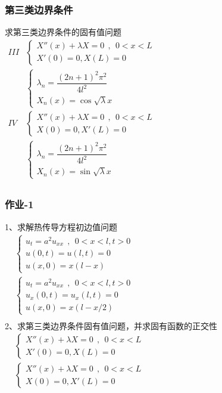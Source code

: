 \begin{frame}
	\frametitle{第三类边界条件}
	求第三类边界条件的固有值问题\\
	$\begin{array}{lllllllll}
	III & \begin{cases}
			X'' (x)  + \lambda X =0   ~~,~~ 0<x<L\\
			X' (0) =0, X (L) =0
	\end{cases}\\	
	& \begin{cases}
		\lambda_n=\dfrac{(2n+1)^2 \pi ^2}{4l^2}\\
		X_n(x) = \cos \sqrt{\lambda} x
	\end{cases}\\	
	IV&\begin{cases}
		X'' (x)  + \lambda X =0   ~~,~~ 0<x<L\\
		X (0) =0, X' (L) =0
	\end{cases} \\	
	& \begin{cases}
		\lambda_n=\dfrac{(2n+1)^2 \pi ^2}{4l^2}\\
		X_n(x) = \sin \sqrt{\lambda} x
    \end{cases}\\	
	\end{array}$ \\ 
\end{frame}	

\begin{frame}
	\frametitle{作业-1}
	1、求解热传导方程初边值问题\\
	$\begin{array}{lllllllll}
		&\begin{cases}
			u_{t} =a^2u_{xx} ~~,~~ 0<x<l, t>0\\
			u(0,t) =u(l,t)=0 \\
			u(x,0) =x (l-x)
		\end{cases}\\	
		&\begin{cases}
			u_{t} =a^2u_{xx} ~~,~~ 0<x<l, t>0\\
			u_x(0,t) =u_x(l,t)=0 \\
			u(x,0) =x(l-x/2)
		\end{cases} \\	
	\end{array}$ \\ 
	2、求第三类边界条件固有值问题，并求固有函数的正交性\\
	$\begin{array}{lllllllll}
		& \begin{cases}
			X'' (x)  + \lambda X =0   ~~,~~ 0<x<L\\
			X' (0) =0, X (L) =0
		\end{cases}\\	
		&\begin{cases}
			X'' (x)  + \lambda X =0   ~~,~~ 0<x<L\\
			X (0) =0, X' (L) =0
		\end{cases} \\	
	\end{array}$ \\ 	
\end{frame}	

